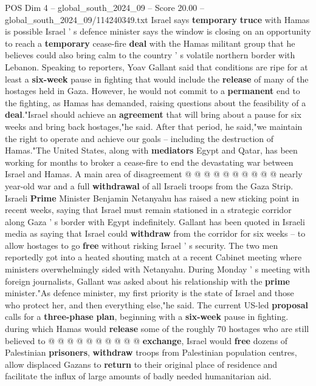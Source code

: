\begin{textsample}{POS Dim 4 – global\_south\_2024\_09 – Score 20.00 – global\_south\_2024\_09/114240349.txt}  \label{ex:f4_pos_274}
Israel says \textbf{temporary} \textbf{truce} with Hamas is possible Israel ' s defence minister says the window is closing on an opportunity to reach a \textbf{temporary} cease-fire \textbf{deal} with the Hamas militant group that he believes could also bring calm to the country ' s volatile northern border with Lebanon.
Speaking to reporters, Yoav Gallant said that conditions are ripe for at least a \textbf{six-week} pause in fighting that would include the \textbf{release} of many of the hostages held in Gaza.
However, he would not commit to a \textbf{permanent} end to the fighting, as Hamas has demanded, raising questions about the feasibility of a \textbf{deal}."Israel should achieve an \textbf{agreement} that will bring about a pause for six weeks and bring back hostages,"he said.
After that period, he said,"we maintain the right to operate and achieve our goals -- including the destruction of Hamas."The United States, along with \textbf{mediators} Egypt and Qatar, has been working for months to broker a cease-fire to end the devastating war between Israel and Hamas.
A main area of disagreement @ @ @ @ @ @ @ @ @ @ nearly year-old war and a full \textbf{withdrawal} of all Israeli troops from the Gaza Strip.
Israeli \textbf{Prime} Minister Benjamin Netanyahu has raised a new sticking point in recent weeks, saying that Israel must remain stationed in a strategic corridor along Gaza ' s border with Egypt indefinitely.
Gallant has been quoted in Israeli media as saying that Israel could \textbf{withdraw} from the corridor for six weeks -- to allow hostages to go \textbf{free} without risking Israel ' s security.
The two men reportedly got into a heated shouting match at a recent Cabinet meeting where ministers overwhelmingly sided with Netanyahu.
During Monday ' s meeting with foreign journalists, Gallant was asked about his relationship with the \textbf{prime} minister."As defence minister, my first priority is the state of Israel and those who protect her, and then everything else,"he said.
The current US-led \textbf{proposal} calls for a \textbf{three-phase} \textbf{plan}, beginning with a \textbf{six-week} pause in fighting. during which Hamas would \textbf{release} some of the roughly 70 hostages who are still believed to @ @ @ @ @ @ @ @ @ @ \textbf{exchange}, Israel would \textbf{free} dozens of Palestinian \textbf{prisoners}, \textbf{withdraw} troops from Palestinian population centres, allow displaced Gazans to \textbf{return} to their original place of residence and facilitate the influx of large amounts of badly needed humanitarian aid.

\end{textsample}
